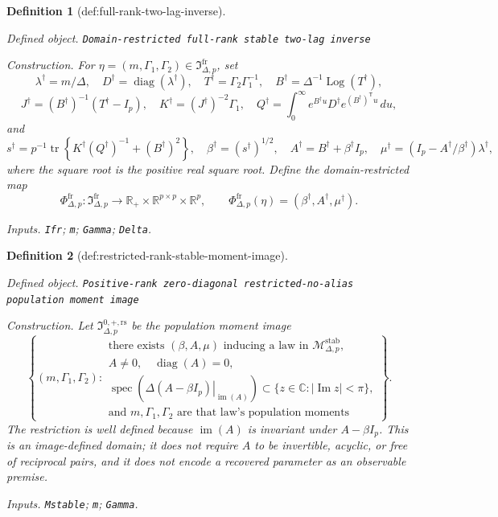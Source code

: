 \documentclass{article}
\newtheorem{definition}{Definition}
\begin{document}
\begin{definition}[def:full-rank-two-lag-inverse]\label{def:full-rank-two-lag-inverse}
\par\smallskip\noindent\emph{Defined object.} \texttt{Domain-\allowbreak{}restricted full-\allowbreak{}rank stable two-\allowbreak{}lag inverse}
\par\smallskip\noindent\emph{Construction.} For \(\eta=(m,\Gamma_1,\Gamma_2)\in\mathfrak I_{\Delta,p}^{\mathrm{fr}}\), set
\[
 \lambda^\dagger=m/\Delta,\quad D^\dagger=\operatorname{diag}(\lambda^\dagger),\quad
 T^\dagger=\Gamma_2\Gamma_1^{-1},\quad
 B^\dagger=\Delta^{-1}\operatorname{Log}(T^\dagger),
\]
\[
 J^\dagger=(B^\dagger)^{-1}(T^\dagger-I_p),\quad
 K^\dagger=(J^\dagger)^{-2}\Gamma_1,\quad
 Q^\dagger=\int_0^\infty e^{B^\dagger u}D^\dagger e^{(B^\dagger)^{\mathsf T}u}\,du,
\]
and
\[
 s^\dagger=p^{-1}\operatorname{tr}\!\left\{K^\dagger(Q^\dagger)^{-1}+(B^\dagger)^2\right\},\quad
 \beta^\dagger=(s^\dagger)^{1/2},\quad
 A^\dagger=B^\dagger+\beta^\dagger I_p,\quad
 \mu^\dagger=(I_p-A^\dagger/\beta^\dagger)\lambda^\dagger,
\]
where the square root is the positive real square root. Define the domain-restricted map
\[
 \Phi^{\mathrm{fr}}_{\Delta,p}:\mathfrak I_{\Delta,p}^{\mathrm{fr}}\longrightarrow
 \mathbb R_+\times\mathbb R^{p\times p}\times\mathbb R^p,
 \qquad
 \Phi^{\mathrm{fr}}_{\Delta,p}(\eta)=(\beta^\dagger,A^\dagger,\mu^\dagger).
\]
\par\smallskip\noindent\emph{Inputs.} \texttt{Ifr}; \texttt{m}; \texttt{Gamma}; \texttt{Delta}.
\end{definition}

\begin{definition}[def:restricted-rank-stable-moment-image]\label{def:restricted-rank-stable-moment-image}
\par\smallskip\noindent\emph{Defined object.} \texttt{Positive-\allowbreak{}rank zero-\allowbreak{}diagonal restricted-\allowbreak{}no-\allowbreak{}alias population moment image}
\par\smallskip\noindent\emph{Construction.} Let \(\mathfrak I_{\Delta,p}^{0,+,\mathrm{rs}}\) be the population moment image
\[
 \left\{(m,\Gamma_1,\Gamma_2):\begin{array}{l}
 \text{there exists }(\beta,A,\mu)\text{ inducing a law in }\mathcal M_{\Delta,p}^{\mathrm{stab}},\\
 A\neq0,\quad \operatorname{diag}(A)=0,\\
 \operatorname{spec}\!\left(\left.\Delta(A-\beta I_p)\right|_{\operatorname{im}(A)}\right)
 \subset\{z\in\mathbb C:|\operatorname{Im}z|<\pi\},\\
 \text{and }m,\Gamma_1,\Gamma_2\text{ are that law's population moments}
 \end{array}\right\}.
\]
The restriction is well defined because \(\operatorname{im}(A)\) is invariant under \(A-\beta I_p\).  This is an image-defined domain; it does not require \(A\) to be invertible, acyclic, or free of reciprocal pairs, and it does not encode a recovered parameter as an observable premise.
\par\smallskip\noindent\emph{Inputs.} \texttt{Mstable}; \texttt{m}; \texttt{Gamma}.
\end{definition}
\end{document}
